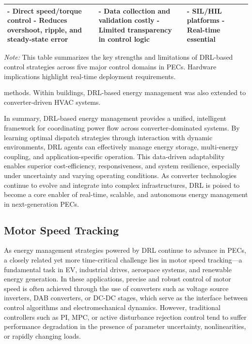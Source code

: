 \begin{table}[t]
\begin{tabular}{|p{2.5cm}|p{6.5cm}|p{4.5cm}|p{3.5cm}|}
- Direct speed/torque control \newline
- Reduces overshoot, ripple, and steady-state error & 
- Data collection and validation costly \newline
- Limited transparency in control logic & 
- SIL/HIL platforms \newline
- Real-time essential \\
\hline
\end{tabular}
\vspace{1mm}
\begin{tablenotes}
\small
\item \textit{Note:} This table summarizes the key strengths and limitations of DRL-based control strategies across five major control domains in PECs. Hardware implications highlight real-time deployment requirements.
\end{tablenotes}
\end{table}

methods. Within buildings, DRL-based energy management was also extended to converter-driven HVAC systems.

In summary, DRL-based energy management provides a unified, intelligent framework for coordinating power flow across converter-dominated systems. By learning optimal dispatch strategies through interaction with dynamic environments, DRL agents can effectively manage energy storage, multi-energy coupling, and application-specific operation. This data-driven adaptability enables superior cost-efficiency, responsiveness, and system resilience, especially under uncertainty and varying operating conditions. As converter technologies continue to evolve and integrate into complex infrastructures, DRL is poised to become a core enabler of real-time, scalable, and autonomous energy management in next-generation PECs.

\subsection{Motor Speed Tracking}
\label{sec:ctrl_motor}

As energy management strategies powered by DRL continue to advance in PECs, a closely related yet more time-critical challenge lies in motor speed tracking—a fundamental task in EV, industrial drives, aerospace systems, and renewable energy generation. In these applications, precise and robust control of motor speed is often achieved through the use of converters such as voltage source inverters, DAB converters, or DC-DC stages, which serve as the interface between control algorithms and electromechanical dynamics. However, traditional controllers such as PI, MPC, or active disturbance rejection control tend to suffer performance degradation in the presence of parameter uncertainty, nonlinearities, or rapidly changing loads.

